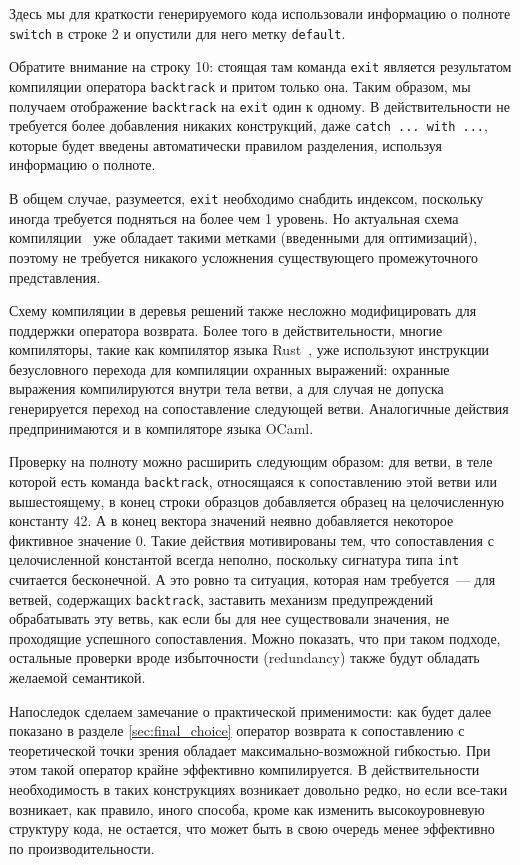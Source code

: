 Здесь мы для краткости генерируемого кода использовали информацию о полноте \lstinline|switch| в строке 2 и опустили для него метку \lstinline|default|.

Обратите внимание на строку 10: стоящая там команда \lstinline|exit| является результатом компиляции оператора \lstinline|backtrack| и притом только она. Таким образом, мы получаем отображение \lstinline|backtrack| на \lstinline|exit| один к одному. В действительности не требуется более добавления никаких конструкций, даже \lstinline[language=none]|catch ... with ...|, которые будет введены автоматически правилом разделения, используя информацию о полноте.

В общем случае, разумеется, \lstinline|exit| необходимо снабдить индексом, поскольку иногда требуется подняться на более чем 1 уровень. Но актуальная схема компиляции~\cite{fessant2001optimizing} уже обладает такими метками (введенными для оптимизаций), поэтому не требуется никакого усложнения существующего промежуточного представления.

Схему компиляции в деревья решений также несложно модифицировать для поддержки оператора возврата. Более того в действительности, многие компиляторы, такие как компилятор языка Rust~\cite{rust_reference}, уже используют инструкции безусловного перехода для компиляции охранных выражений: охранные выражения компилируются внутри тела ветви, а для случая не допуска генерируется переход на сопоставление следующей ветви. Аналогичные действия предпринимаются и в компиляторе языка OCaml.

Проверку на полноту можно расширить следующим образом: для ветви, в теле которой есть команда \lstinline|backtrack|, относящаяся к сопоставлению этой ветви или вышестоящему, в конец строки образцов добавляется образец на целочисленную константу 42. А в конец вектора значений неявно добавляется некоторое фиктивное значение 0. Такие действия мотивированы тем, что сопоставления с целочисленной константой всегда неполно, поскольку сигнатура типа \lstinline|int| считается бесконечной. А это ровно та ситуация, которая нам требуется~--- для ветвей, содержащих \lstinline|backtrack|, заставить механизм предупреждений~\cite{maranget2007warnings} обрабатывать эту ветвь, как если бы для нее существовали значения, не проходящие успешного сопоставления. Можно показать, что при таком подходе, остальные проверки вроде избыточности (redundancy) также будут обладать желаемой семантикой.

Напоследок сделаем замечание о практической применимости: как будет далее показано в разделе \ref{sec:final_choice} оператор возврата к сопоставлению с теоретической точки зрения обладает максимально-возможной гибкостью. При этом такой оператор крайне эффективно компилируется. В действительности необходимость в таких конструкциях возникает довольно редко, но если все-таки возникает, как правило, иного способа, кроме как изменить высокоуровневую структуру кода, не остается, что может быть в свою очередь менее эффективно по производительности.

